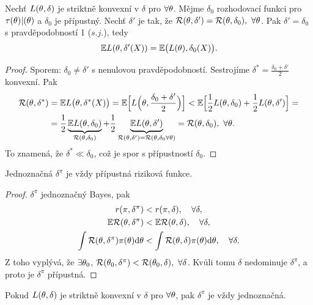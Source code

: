 
\begin{theorem}
	Nechť $L(\theta,\delta)$ je striktně konvexní v $\delta$ pro $\forall\theta$. Mějme $\delta_0$ rozhodovací funkci pro $\tau(\theta)|(\theta)$ a $\delta_0$ je přípustný. Nechť $\delta'$ je tak, že $\mathcal{R}(\theta,\delta')=\mathcal{R}(\theta,\delta_0),~\forall\theta$. Pak $\delta'=\delta_0$ s pravděpodobností 1 ($s.j.$), tedy $$ \mathbb{E} L(\theta,\delta'(X))=\mathbb{E}\big(L(\theta),\delta_0(X)\big).$$
	\begin{proof}
		Sporem: $\delta_0\neq\delta'$ s nenulovou pravděpodobností. Sestrojíme $\delta^\ast=\frac{\delta_0+\delta'}{2}$ konvexní. Pak
		\[
		\begin{split}
		\mathcal{R}(\theta,\delta^\ast)&=\mathbb{E} L\big(\theta,\delta^\ast(X)\big)=\mathbb{E}\Big[L\Big(\theta,\frac{\delta_0+\delta'}{2}\Big)\Big]<\mathbb{E}\Big[\frac{1}{2}L(\theta,\delta_0)+\frac{1}{2}L(\theta,\delta')\Big]=\\&= \frac{1}{2}\underbrace{\mathbb{E} L(\theta,\delta_0)}_{\mathcal{R}(\theta,\delta_0)}+\frac{1}{2}\underbrace{\mathbb{E} L(\theta,\delta')}_{\mathcal{R}(\theta,\delta')=\mathcal{R}(\theta,\delta_0\forall\theta)}=\mathcal{R}(\theta,\delta_0),~\forall\theta.
		\end{split}
		\] 
		To znamená, že $\delta^\ast\ll\delta_0$, což je spor s přípustností $\delta_0$.
	\end{proof}
\end{theorem}
\begin{theorem}
	Jednoznačná $\delta^\pi$ je vždy přípustná riziková funkce.\begin{proof}
		$\delta^\pi$ jednoznačný Bayes, pak \[
		\begin{split}
		r(\pi,\delta^\pi)&<r(\pi,\delta),\quad\forall\delta,\\
		\mathbb{E} \mathcal{R}(\theta,\delta^\pi)&<\mathbb{E} \mathcal{R}(\theta,\delta),\quad\forall\delta,\\
		\int\mathcal{R}(\theta,\delta^\pi)\pi(\theta)\mathrm{d}\theta&<\int\mathcal{R}(\theta,\delta)\pi(\theta)\mathrm{d}\theta,\quad\forall\delta.		
		\end{split}
		\]
		Z toho vyplývá, že $\exists\theta_0$, $\mathcal{R}(\theta_0,\delta^\pi)<\mathcal{R}(\theta_0,\delta),~\forall\delta$. Kvůli tomu $\delta$ nedominuje $\delta^\pi$, a proto je $\delta^\pi$ přípustná.
	\end{proof}
\end{theorem}
\begin{remark}
	Pokud $L(\theta,\delta)$ je striktně konvexní v $\delta$ pro $\forall\theta$, pak $\delta^\pi$ je vždy jednoznačná.
\end{remark}
